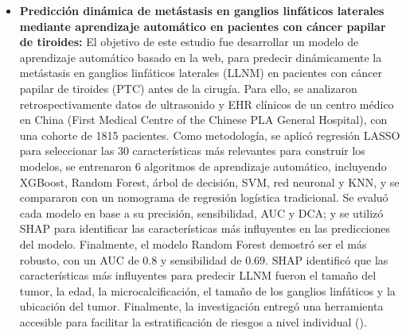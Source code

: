 \begin{itemize}
    \item \textbf{Predicción dinámica de metástasis en ganglios linfáticos laterales mediante aprendizaje automático en pacientes con cáncer papilar de tiroides:} El objetivo de este estudio fue desarrollar un modelo de aprendizaje automático basado en la web, para predecir dinámicamente la metástasis en ganglios linfáticos laterales (LLNM) en pacientes con cáncer papilar de tiroides (PTC) antes de la cirugía. Para ello, se analizaron retrospectivamente datos de ultrasonido y EHR clínicos de un centro médico en China (First Medical Centre of the Chinese PLA General Hospital), con una cohorte de 1815 pacientes. Como metodología, se aplicó regresión LASSO para seleccionar las 30 características más relevantes para construir los modelos, se entrenaron 6 algoritmos de aprendizaje automático, incluyendo XGBoost, Random Forest, árbol de decisión, SVM, red neuronal y KNN, y se compararon con un nomograma de regresión logística tradicional. Se evaluó cada modelo en base a su precisión, sensibilidad, AUC y DCA; y se utilizó SHAP para identificar las características más influyentes en las predicciones del modelo. Finalmente, el modelo Random Forest demostró ser el más robusto, con un AUC de 0.8 y sensibilidad de 0.69. SHAP identificó que las características más influyentes para predecir LLNM fueron el tamaño del tumor, la edad, la microcalcificación, el tamaño de los ganglios linfáticos y la ubicación del tumor. Finalmente, la investigación entregó una herramienta accesible para facilitar la estratificación de riesgos a nivel individual (\cite{article4}).

\end{itemize}
